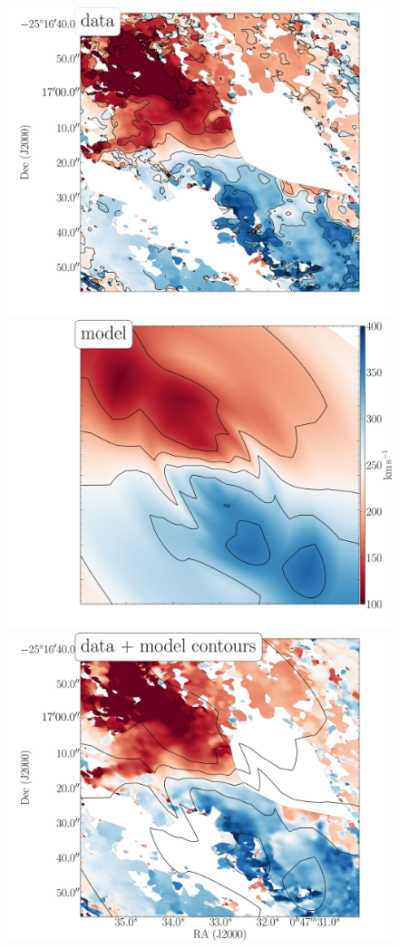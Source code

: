 \begin{figure}
	\centering
	\includegraphics[scale=0.18]{images/chapters/papers/outflow/outflow_figA1a.pdf}
	\includegraphics[scale=0.18]{images/chapters/papers/outflow/outflow_figA1b.pdf}\\
	\includegraphics[scale=0.18]{images/chapters/papers/outflow/outflow_figA1c.pdf}

\end{figure}
